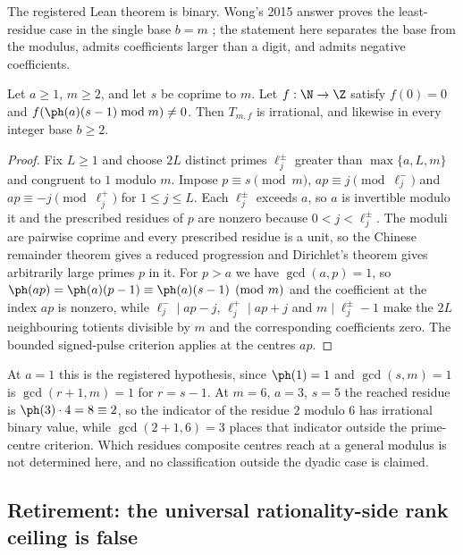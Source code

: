 The registered Lean theorem is binary. Wong's 2015 answer proves the
least-residue case in the single base $b=m$ ; the statement here
separates the base from the modulus, admits coefficients larger than a digit,
and admits negative coefficients.

\begin{prop}\label{prop:composite-centres}
Let $a\ge1$, $m\ge2$, and let $s$ be coprime to $m$. Let $f:\N\to\Z$ satisfy
$f(0)=0$ and $f(\ph(a)(s-1)\bmod m)\ne0$. Then $T_{m,f}$ is irrational, and
likewise in every integer base $b\ge2$.  
\end{prop}

\begin{proof}
Fix $L\ge1$ and choose $2L$ distinct primes $\ell_j^\pm$ greater than
$\max\{a,L,m\}$ and congruent to $1$ modulo $m$. Impose $p\equiv s\pmod m$,
$ap\equiv j\pmod{\ell_j^-}$ and $ap\equiv-j\pmod{\ell_j^+}$ for
$1\le j\le L$. Each $\ell_j^\pm$ exceeds $a$, so $a$ is invertible modulo it
and the prescribed residues of $p$ are nonzero because $0<j<\ell_j^\pm$. The
moduli are pairwise coprime and every prescribed residue is a unit, so the
Chinese remainder theorem gives a reduced progression and Dirichlet's theorem
gives arbitrarily large primes $p$ in it. For $p>a$ we have $\gcd(a,p)=1$, so
$\ph(ap)=\ph(a)(p-1)\equiv\ph(a)(s-1)\pmod m$ and the coefficient at the
index $ap$ is nonzero, while $\ell_j^-\mid ap-j$, $\ell_j^+\mid ap+j$ and
$m\mid\ell_j^\pm-1$ make the $2L$ neighbouring totients divisible by $m$ and
the corresponding coefficients zero. The bounded signed-pulse criterion
applies at the centres $ap$.
\end{proof}

At $a=1$ this is the registered hypothesis, since $\ph(1)=1$ and
$\gcd(s,m)=1$ is $\gcd(r+1,m)=1$ for $r=s-1$. At $m=6$, $a=3$, $s=5$ the
reached residue is $\ph(3)\cdot4=8\equiv2$, so the indicator of the residue
$2$ modulo $6$ has irrational binary value, while $\gcd(2+1,6)=3$ places that
indicator outside the prime-centre criterion. Which residues composite centres
reach at a general modulus is not determined here, and no classification
outside the dyadic case is claimed. 

\subsection{Retirement: the universal rationality-side rank ceiling is false}
\label{ssec:rankupper-retired}

